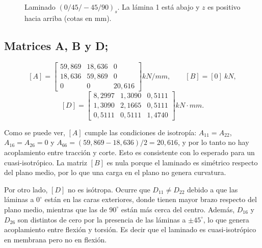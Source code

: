 \documentclass[11pt,a4paper]{article}
\newcommand{\kNmm}{\si{kN/mm}}
\newcommand{\kNmmm}{\si{kN\cdot mm}}
\begin{document}
\begin{figure}[H]
\centering
{}
\caption{Laminado $(0/45/-45/90)_s$. La lámina 1 está abajo y $z$ es positivo hacia arriba (cotas en mm).}
\end{figure}

\subsection{Matrices A, B y D;}
\[
[A]=\begin{bmatrix}59{,}869&18{,}636&0\\18{,}636&59{,}869&0\\0&0&20{,}616\end{bmatrix}\kNmm,\qquad
[B]=[0]\ \si{kN},
\]
\[
[D]=\begin{bmatrix}8{,}2997&1{,}3090&0{,}5111\\1{,}3090&2{,}1665&0{,}5111\\0{,}5111&0{,}5111&1{,}4740\end{bmatrix}\kNmmm .
\]

Como se puede ver, $[A]$ cumple las condiciones de isotropía: $A_{11}=A_{22}$, $A_{16}=A_{26}=0$ y $A_{66}=(59{,}869-18{,}636)/2=20{,}616$, y por lo tanto no hay acoplamiento entre tracción y corte. Esto es consistente con lo esperado para un cuasi-isotrópico. La matriz $[B]$ es nula porque el laminado es simétrico respecto del plano medio, por lo que una carga en el plano no genera curvatura.

Por otro lado, $[D]$ no es isótropa. Ocurre que $D_{11}\neq D_{22}$ debido a que las láminas a $0^\circ$ están en las caras exteriores, donde tienen mayor brazo respecto del plano medio, mientras que las de $90^\circ$ están más cerca del centro. Además, $D_{16}$ y $D_{26}$ son distintos de cero por la presencia de las láminas a $\pm45^\circ$, lo que genera acoplamiento entre flexión y torsión. Es decir que el laminado es cuasi-isotrópico en membrana pero no en flexión.
\end{document}
